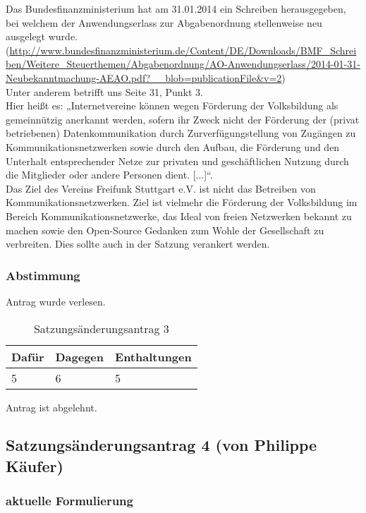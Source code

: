 \documentclass[a4paper]{scrartcl}
\begin{document}
Das Bundesfinanzministerium hat am 31.01.2014 ein Schreiben herausgegeben, bei welchem der Anwendungserlass zur Abgabenordnung stellenweise neu ausgelegt wurde.(\url{http://www.bundesfinanzministerium.de/Content/DE/Downloads/BMF_Schreiben/Weitere_Steuerthemen/Abgabenordnung/AO-Anwendungserlass/2014-01-31-Neubekanntmachung-AEAO.pdf?__blob=publicationFile&v=2})\\

Unter anderem betrifft uns Seite 31, Punkt 3.\\
Hier heißt es: „Internetvereine können wegen Förderung der Volksbildung als gemeinnützig anerkannt werden, sofern ihr Zweck nicht der Förderung der (privat betriebenen) Datenkommunikation durch Zurverfügungstellung von Zugängen zu Kommunikationsnetzwerken sowie durch den Aufbau, die Förderung und den Unterhalt entsprechender Netze zur privaten und geschäftlichen Nutzung durch die Mitglieder oder andere Personen dient. [...]“.\\

Das Ziel des Vereins Freifunk Stuttgart e.V. ist nicht das Betreiben von Kommunikationsnetzwerken. Ziel ist vielmehr die Förderung der Volksbildung im Bereich Kommunikationsnetzwerke, das Ideal von freien Netzwerken bekannt zu machen sowie den Open-Source Gedanken zum Wohle der Gesellschaft zu verbreiten.
Dies sollte auch in der Satzung verankert werden.\\

\subsubsection{Abstimmung}

Antrag wurde verlesen. 

\begin{table}[h]
	\begin{tabularx}{\textwidth}{XXX}
		Dafür & Dagegen & Enthaltungen\\
		\toprule
		5 & 6 & 5\\
	\end{tabularx}
	\caption{Satzungsänderungsantrag 3}
\end{table}

Antrag ist abgelehnt.

\subsection{Satzungsänderungsantrag 4 (von Philippe Käufer)}
\subsubsection{aktuelle Formulierung}
\end{document}
